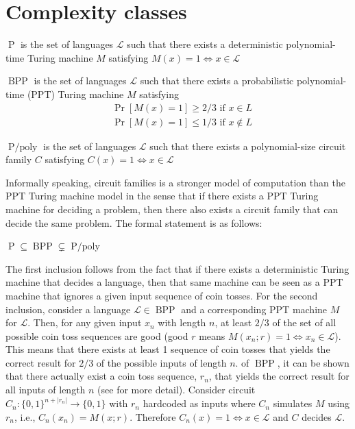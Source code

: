 \section{Complexity classes}\label{subsec:Complexity classes}
\begin{definition}
$\operatorname{P}$ is the set of languages $\mathscr{L}$ such that there exists a deterministic polynomial-time Turing machine $M$ satisfying $M(x) = 1 \iff x \in \mathscr{L}$ 
\end{definition}
\begin{definition}
$\operatorname{BPP}$ is the set of languages $\mathscr{L}$ such that there exists a probabilistic polynomial-time (PPT) Turing machine $M$ satisfying
\begin{align*}
& \operatorname{Pr}[M(x)=1] \geq 2/3 \text{ if $x \in L$}
\\
& \operatorname{Pr}[M(x)=1] \leq 1/3 \text{ if $x \notin L$}
\end{align*}
\end{definition}
\begin{definition}
$\operatorname{P/poly}$ is the set of languages $\mathscr{L}$ such that there exists a polynomial-size circuit family $C$ satisfying $C(x) = 1 \iff x \in \mathscr{L}$ 
\end{definition}
Informally speaking, circuit families is a stronger model of computation than the PPT Turing machine model in the sense that if there exists a PPT Turing machine for deciding a problem, then there also exists a circuit family that can decide the same problem. The formal statement is as follows: 
\begin{theorem}
    \label{thm:compl-class}
    $\operatorname{P} \subseteq \operatorname{BPP} \subsetneq \operatorname{P/poly}$
\end{theorem}
The first inclusion follows from the fact that if there exists a deterministic Turing machine that decides a language, then that same machine can be seen as a PPT machine that ignores a given input sequence of coin tosses. For the second inclusion, consider a language $\mathscr{L} \in \operatorname{BPP}$ and a corresponding PPT machine $M$ for $\mathscr{L}$. Then, for any given input $x_n$ with length $n$, at least $2/3$ of the set of all possible coin toss sequences are good (good $r$ means $M(x_n;r) = 1 \iff x_n \in \mathscr{L}$). This means that there exists at least 1 sequence of coin tosses that yields the correct result for $2/3$ of the possible inputs of length $n$.  of $\operatorname{BPP}$, it can be shown that there actually exist a coin toss sequence, $r_n$, that yields the correct result for all inputs of length $n$ (see \cite{Adleman1978TwoTO,Gol01} for more detail). Consider circuit $C_n \colon \{0,1\}^{n+|r_n|} \to \{0,1\}$ with $r_n$ hardcoded as inputs where $C_n$ simulates $M$ using $r_n$, i.e., $C_n(x_n) = M(x;r)$. Therefore $C_n(x) = 1 \iff x \in \mathscr{L}$ and $C$ decides $\mathscr{L}$.

